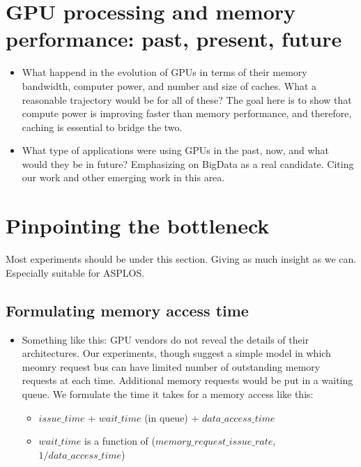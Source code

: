 \section{GPU processing and memory performance: past, present, future}

\begin{itemize}

\item What happend in the evolution of GPUs in terms of their memory bandwidth, computer power, and number and size of
caches. What a reasonable trajectory would be for all of these? The goal here is to show that compute power is improving
faster than memory performance, and therefore, caching is essential to bridge the two.

\item What type of applications were using GPUs in the past, now, and what would they be in future? Emphasizing on BigData
as a real candidate. Citing our work and other emerging work in this area.

\end{itemize}



\section{Pinpointing the bottleneck}

Most experiments should be under this section. Giving as much insight as we can. Especially suitable for ASPLOS.

\subsection{Formulating memory access time}

\begin{itemize}

\item Something like this: GPU vendors do not reveal the details of their architectures. Our experiments, though suggest
a simple model in which meomry request bus can have limited number of outstanding memory requests at each time.
Additional memory requests would be put in a waiting queue. We formulate the time it takes for a memory access like
this:

\begin{itemize}
\item $issue\_time$ + $wait\_time$ (in queue) + $data\_access\_time$

\item $wait\_time$ is a function of ($memory\_request\_issue\_rate$, $1 / data\_access\_time$)

\end{itemize}
\end{itemize}

